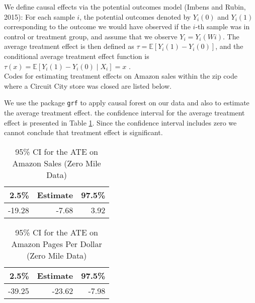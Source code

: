 \documentclass{article}
\begin{document}
We define causal effects via the potential outcomes model (Imbens and Rubin, 2015): For each sample
$i$, the potential outcomes denoted by $Y_i(0)$ and $Y_i(1)$ corresponding to the outcome we would have observed  if the $i$-th sample was in control or treatment group, and assume that we observe $Y_i =Y_i(Wi)$.
The average treatment effect is then defined as 
$\tau = \mathbb{E} [Y_i(1)-Y_i(0)]$, and the conditional average
treatment effect function is 
$\tau(x)=\mathbb{E}[ Y_i(1)-Y_i(0)\mid X_i] =x$ .\\

Codes for estimating treatment effects  on Amazon sales within the zip code where a Circuit City store was closed are listed below.


We use the package \texttt{grf} to apply causal forest on our data and also to estimate the average treatment effect. the confidence interval for the average treatment effect is presented in Table \ref{tab:ama_cf1_ate}. Since the confidence interval includes zero we cannot conclude that treatment effect is significant.

\begin{table}[ht]
\caption{95\% CI for the ATE on Amazon Sales (Zero Mile Data)} 
\label{tab:ama_cf1_ate}
\vspace{1em}
\centering
\begin{tabular}{rrr}
  \hline
2.5\%  & Estimate & 97.5\% \\ 
  \hline
-19.28 & -7.68 & 3.92 \\ 
   \hline
\end{tabular}
\end{table}



\begin{table}[ht]
\caption{95\% CI for the ATE on Amazon Pages Per Dollar (Zero Mile Data)} 
\vspace{1em}
\centering
\begin{tabular}{rrr}
  \hline
  2.5\%  & Estimate & 97.5\% \\ 
  \hline
 -39.25 & -23.62 & -7.98 \\ 
   \hline
\end{tabular}
\end{table}

\pagebreak


% 
\end{document}
